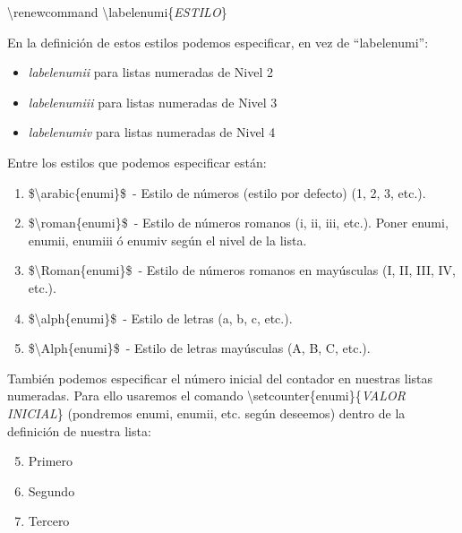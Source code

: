 \documentclass[12pt]{book} %
\begin{document}
\textbackslash renewcommand \textbackslash labelenumi\{\emph{ESTILO}\}

En la definición de estos estilos podemos especificar, en vez de ``labelenumi'':

\begin{itemize}
	\item \emph{labelenumii} para listas numeradas de Nivel 2
	\item \emph{labelenumiii} para listas numeradas de Nivel 3
	\item \emph{labelenumiv} para listas numeradas de Nivel 4
\end{itemize}

Entre los estilos que podemos especificar están:

\renewcommand\labelenumi{\scriptsize\emph{$\Roman{enumi}$.}}
\begin{enumerate}

	\item \$\textbackslash arabic\{enumi\}\$\ - Estilo de números (estilo por defecto) (1, 2, 3, etc.).
	
	\item \$\textbackslash roman\{enumi\}\$\ - Estilo de números romanos (i, ii, iii, etc.). Poner enumi, enumii, enumiii ó enumiv según el nivel de la lista.

	\item \$\textbackslash Roman\{enumi\}\$\ - Estilo de números romanos en mayúsculas (I, II, III, IV, etc.).

	\item \$\textbackslash alph\{enumi\}\$\ - Estilo de letras (a, b, c, etc.).

	\item \$\textbackslash Alph\{enumi\}\$\ - Estilo de letras mayúsculas (A, B, C, etc.).

\end{enumerate}

\renewcommand\labelenumi{$\arabic{enumi}$.}

También podemos especificar el número inicial del contador en nuestras listas numeradas. Para ello usaremos el comando \textbackslash setcounter\{enumi\}\{\emph{VALOR INICIAL}\} (pondremos enumi, enumii, etc. según deseemos) dentro de la definición de nuestra lista:

\begin{enumerate}
\setcounter{enumi}{4} %
	\item Primero
	\item Segundo
	\item Tercero
\end{enumerate}
\end{document}
